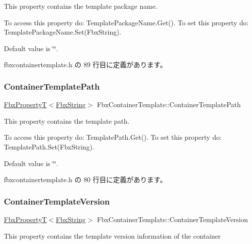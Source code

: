 This property contains the template package name.

To access this property do\+: Template\+Package\+Name.\+Get(). To set this property do\+: Template\+Package\+Name.\+Set(\+Fbx\+String).

Default value is \char`\"{}\char`\"{}. 

 fbxcontainertemplate.\+h の 89 行目に定義があります。

\mbox{\label{class_fbx_container_template_a6377f5a818df77faf04a001ae7a22cca}} 
\subsubsection{\texorpdfstring{Container\+Template\+Path}{ContainerTemplatePath}}
{\footnotesize\ttfamily \hyperlink{class_fbx_property_t}{Fbx\+PropertyT}$<$\hyperlink{class_fbx_string}{Fbx\+String}$>$ Fbx\+Container\+Template\+::\+Container\+Template\+Path}

This property contains the template path.

To access this property do\+: Template\+Path.\+Get(). To set this property do\+: Template\+Path.\+Set(\+Fbx\+String).

Default value is \char`\"{}\char`\"{}. 

 fbxcontainertemplate.\+h の 80 行目に定義があります。

\mbox{\label{class_fbx_container_template_ac2029d97e3946bc2a62f2a673a1981c0}} 
\subsubsection{\texorpdfstring{Container\+Template\+Version}{ContainerTemplateVersion}}
{\footnotesize\ttfamily \hyperlink{class_fbx_property_t}{Fbx\+PropertyT}$<$\hyperlink{class_fbx_string}{Fbx\+String}$>$ Fbx\+Container\+Template\+::\+Container\+Template\+Version}

This property contains the template version information of the container

